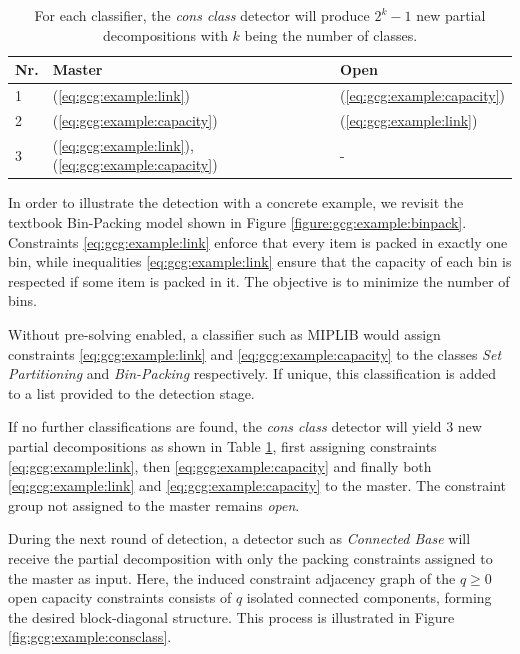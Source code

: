 		\begin{table}[ht!]
			\centering
			\begin{tabular}{l|l|l}
				\textbf{Nr.} & \textbf{Master} & \textbf{Open} \\
				\toprule
				\toprule
				1 & (\ref{eq:gcg:example:link}) & (\ref{eq:gcg:example:capacity}) \\ 
				2 & (\ref{eq:gcg:example:capacity}) & (\ref{eq:gcg:example:link}) \\
				3 & (\ref{eq:gcg:example:link}), (\ref{eq:gcg:example:capacity}) & -
			\end{tabular}
			\caption{For each classifier, the \textit{cons class} detector will produce $2^k - 1$ new partial decompositions with $k$ being the number of classes.}
			\label{table:gcg:example:consclass}
		\end{table}
		
		In order to illustrate the detection with a concrete example, we revisit the textbook Bin-Packing model shown in Figure \ref{figure:gcg:example:binpack}.
		Constraints \ref{eq:gcg:example:link} enforce that every item is packed in exactly one bin, while inequalities \ref{eq:gcg:example:link} ensure that the capacity of each bin is respected if some item is packed in it.
		The objective is to minimize the number of bins.
		
		Without pre-solving enabled, a classifier such as MIPLIB would assign constraints \ref{eq:gcg:example:link} and \ref{eq:gcg:example:capacity} to the classes \textit{Set Partitioning} and \textit{Bin-Packing} respectively.
		If unique, this classification is added to a list provided to the detection stage.
		
		If no further classifications are found, the \textit{cons class} detector will yield 3 new partial decompositions as shown in Table \ref{table:gcg:example:consclass}, first assigning constraints \ref{eq:gcg:example:link}, then \ref{eq:gcg:example:capacity} and finally both \ref{eq:gcg:example:link} and \ref{eq:gcg:example:capacity} to the master.
		The constraint group not assigned to the master remains \textit{open}.
		
		During the next round of detection, a detector such as \textit{Connected Base} will receive the partial decomposition with only the packing constraints assigned to the master as input.
		Here, the induced constraint adjacency graph of the $q \ge 0$ open capacity constraints consists of $q$ isolated connected components, forming the desired block-diagonal structure.
		This process is illustrated in Figure \ref{fig:gcg:example:consclass}.
		
